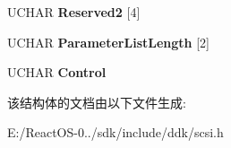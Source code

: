 \begin{DoxyCompactItemize}
U\+C\+H\+AR {\bfseries Reserved2} \mbox{[}4\mbox{]}
\item 
\mbox{\label{struct___c_d_b_1_1___l_o_g_s_e_l_e_c_t_a624a1e15f30b253b0fe8d3a6f3509271}} 
U\+C\+H\+AR {\bfseries Parameter\+List\+Length} \mbox{[}2\mbox{]}
\item 
\mbox{\label{struct___c_d_b_1_1___l_o_g_s_e_l_e_c_t_a4f80291cb0c09484c5b9ac51e771c417}} 
U\+C\+H\+AR {\bfseries Control}
\end{DoxyCompactItemize}


该结构体的文档由以下文件生成\+:\begin{DoxyCompactItemize}
\item 
E\+:/\+React\+O\+S-\/0../sdk/include/ddk/scsi.\+h\end{DoxyCompactItemize}

